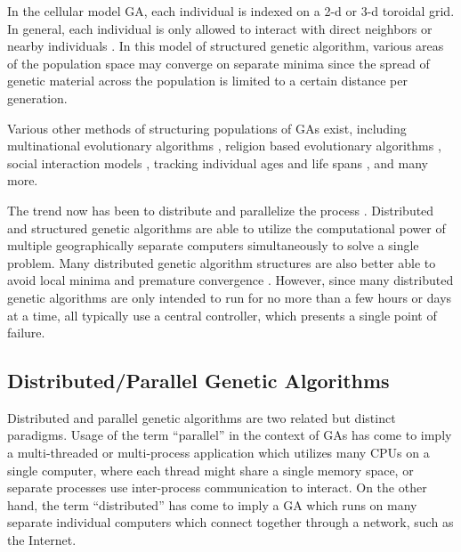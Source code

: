     In the cellular model GA, each individual is indexed on a 2-d or 3-d toroidal
      grid. 
    In general, each individual is only allowed to interact with direct
    neighbors or nearby individuals \cite{Alba2005}. 
    In this model of structured genetic algorithm, various areas of the
      population space may converge on separate minima since the spread of
      genetic material across the population is limited to a certain distance per
      generation.

    Various other methods of structuring populations of GAs exist, including
      multinational evolutionary algorithms \cite{Ursem2000}, religion based
      evolutionary algorithms \cite{Thomsen2000}, social interaction models
      \cite{Al-madi2008}, tracking individual ages and life spans
      \cite{Kubota1997}, and many more.

    The trend now has been to distribute and parallelize the process
      \cite{Tomassini1999, DAmbrosio2006, Kim2006, Cantu-Paz2007, Cantor2010}. 
    Distributed and structured genetic algorithms are able to utilize the
      computational power of multiple geographically separate computers
      simultaneously to solve a single problem. 
    Many distributed genetic algorithm structures are also better able to avoid
      local minima and premature convergence \cite{Artyushenko2009, Alba2005}.
    However, since many distributed genetic algorithms are only intended to run
      for no more than a few hours or days at a time, all typically use a central
      controller, which presents a single point of failure. 

  \subsection{Distributed/Parallel Genetic Algorithms} %
    Distributed and parallel genetic algorithms are two related but distinct
      paradigms. 
    Usage of the term ``parallel'' in the context of GAs has come to imply a
      multi-threaded or multi-process application which utilizes many CPUs on a
      single computer, where each thread might share a single memory space, or
      separate processes use inter-process communication to interact. 
    On the other hand, the term ``distributed'' has come to imply a GA which
      runs on many separate individual computers which connect together through a
      network, such as the Internet. 

